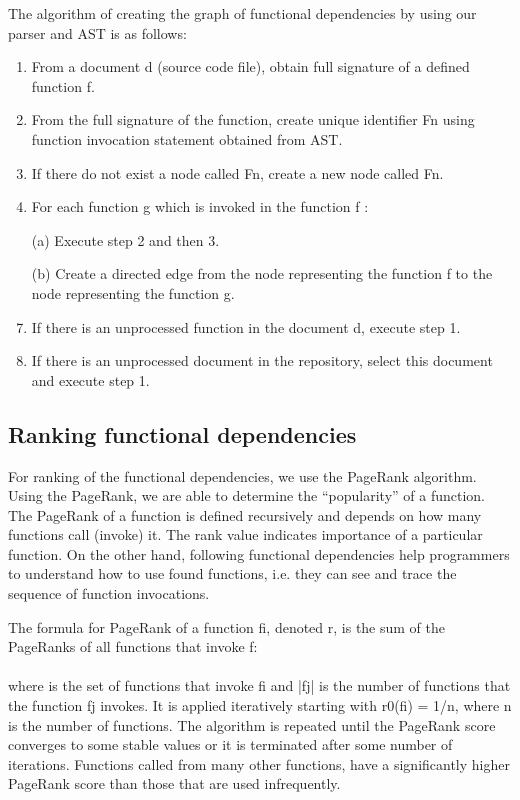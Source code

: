\documentclass{llncs}
\begin{document}
The algorithm of creating the graph of functional dependencies by using our parser
and AST is as follows:
\\
\begin{enumerate}
\item From a document d (source code file), obtain full signature of a defined 
function f.
\item From the full signature of the function, create unique identifier Fn using 
function invocation statement obtained from AST.
\item If there do not exist a node called Fn, create a new node called Fn.
\item For each function g which is invoked in the function f :

\item [(a)] Execute step 2 and then 3.

\item [(b)] Create a directed edge from the node representing the function f to the 
node representing the function g.
\item If there is an unprocessed function in the document d, execute step 1.
\item If there is an unprocessed document in the repository, select this document 
and execute step 1.
\end{enumerate}
\subsection{Ranking functional dependencies}

For ranking of the functional dependencies, we use the PageRank algorithm. Using
the PageRank, we are able to determine the “popularity” of a function. The PageRank
of a function is defined recursively and depends on how many functions call (invoke)
it. The rank value indicates importance of a particular function. On the other hand,
following functional dependencies help programmers to understand how to use found
functions, i.e. they can see and trace the sequence of function invocations.

The formula for PageRank of a function fi, denoted r, is the sum of the PageRanks
of all functions that invoke f:
\\ \\
where is the set of functions that invoke fi and |fj| is the number of functions that
the function fj invokes. It is applied iteratively starting with r0(fi) = 1/n, where n is the
number of functions. The algorithm is repeated until the PageRank score converges to
some stable values or it is terminated after some number of iterations. Functions
called from many other functions, have a significantly higher PageRank score than
those that are used infrequently.
\end{document}

